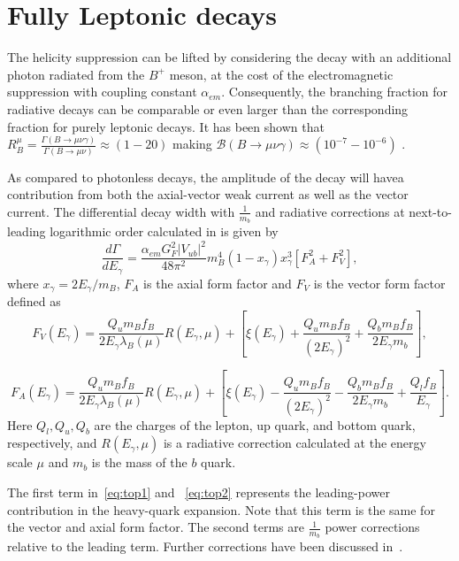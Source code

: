 \section{Fully Leptonic  decays}
\label{lnugamma}
The helicity suppression can be lifted by considering the decay with an additional photon radiated from the $B^{+}$ meson, at the cost of the electromagnetic suppression with coupling constant $\alpha_{em}$. Consequently, the branching fraction for radiative decays can be comparable or even larger than the corresponding fraction for purely leptonic decays. It has been shown that $R^{\mu}_{B}=\frac{\Gamma(B\rightarrow \mu \nu \gamma)}{\Gamma(B\rightarrow \mu \nu)}\approx(1-20)$ making $\mathcal{B}(B\rightarrow \mu \nu \gamma)\approx(10^{-7}-10^{-6})$ \cite{Burdman:1994ip}.

As compared to photonless decays, the amplitude of the decay will havea contribution from both the axial-vector weak current as well as the vector current.
The differential decay width with $\frac{1}{m_{b}}$ and radiative corrections
at next-to-leading logarithmic order calculated in\cite{Beneke:2011nf} is given by
\begin{equation}
\frac{d\Gamma}{dE_{\gamma}} = \frac{\alpha_{em}G^{2}_{F}|V_{ub}|^{2}}{48 \pi^{2}}m_{B}^{4}(1 - x_{\gamma})x_{\gamma}^{3}[F_A^{2} + F_V^{2}],
\end{equation}
 where $x_{\gamma} = 2E_{\gamma}/m_{B}$, $F_A$ is the axial form factor and $F_V$  is the vector form factor defined as
\begin{equation}
F_{V}(E_{\gamma}) = \frac{Q_{u}m_{B}f_{B}}{2E_{\gamma}\lambda_{B}(\mu)} R(E_{\gamma}, \mu) + [\xi(E_\gamma) +  \frac{Q_{u}m_{B}f_{B}}{(2E_{\gamma})^{2}} + \frac{Q_{b}m_{B}f_{B}}{2E_{\gamma}m_{b}}],
\label{eq:top1}
\end{equation}

\begin{equation}
F_{A}(E_{\gamma}) = \frac{Q_{u}m_{B}f_{B}}{2E_{\gamma}\lambda_{B}(\mu)} R(E_{\gamma}, \mu) + [\xi(E_\gamma) -  \frac{Q_{u}m_{B}f_{B}}{(2E_{\gamma})^{2}} - \frac{Q_{b}m_{B}f_{B}}{2E_{\gamma}m_{b}} + \frac{Q_{l}f_{B}}{E_{\gamma}}].
\label{eq:top2}
\end{equation}
Here $Q_{l},Q_{u},Q_{b}$ are the charges of the lepton, up quark, and
bottom quark, respectively, and $R(E_{\gamma}, \mu)$ is a radiative correction
calculated at the energy scale $\mu$ %
and $m_{b}$ is the mass of the $b$ quark.

The first term in~\autoref{eq:top1} and ~\autoref{eq:top2} represents the leading-power contribution in the heavy-quark expansion. Note that this term
is the same for the vector and axial form factor. The second terms are $\frac{1}{m_{b}}$ power corrections relative to the leading term. Further corrections have been discussed in~\cite{Wang:2016beq}.



